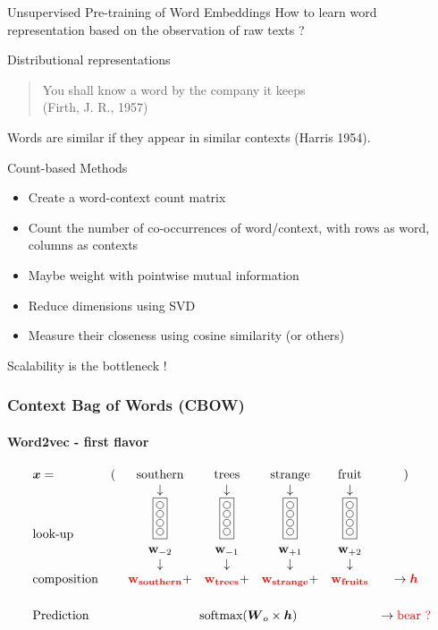 \begin{frame}{Unsupervised Pre-training of Word Embeddings}
  How to learn word representation based on the observation of raw texts ?
  \begin{block}{Distributional representations}
    \begin{quote}
    You shall know a word by the company it keeps\\  (Firth, J. R., 1957)
  \end{quote}
  Words are similar if they appear in similar contexts (Harris 1954).
\end{block}
\begin{block}{Count-based Methods}
  \begin{itemize}
  \item Create a word-context count matrix 
  \item Count the number of co-occurrences of word/context, with rows
    as word, columns as contexts
  \item Maybe weight with pointwise mutual information 
  \item Reduce dimensions using SVD 
  \item Measure their closeness using cosine similarity (or others)
\end{itemize}
\end{block}
Scalability is the bottleneck ! 
\end{frame}

\begin{frame}
  \frametitle{Context Bag of Words (CBOW)}
  \framesubtitle{Word2vec - first flavor}
  \begin{center}
    \begin{displaymath}
      \begin{array}{lcccccc}
        \x=&( &\textrm{southern} &\textrm{trees}  &\textrm{strange} &\textrm{fruit}  &)\\
           &&\downarrow & \downarrow & \downarrow & \downarrow & \\
        \textrm{look-up}&&\wemb &\wemb &\wemb &\wemb & \\
           &&  \vct{w}_{-2} &  \vct{w}_{-1} &  \vct{w}_{+1} &  \vct{w}_{+2} &\\
           && \downarrow &\downarrow &\downarrow &\downarrow & \\
        \textrm{composition} &&\important{\vct{w}_{southern}}+ &\important{\vct{w}_{trees}}+ &\important{\vct{w}_{strange}}+ &\important{\vct{w}_{fruits}} &\rightarrow\important{\seq{h}} \\[4ex]
        \textrm{Prediction}   &&\multicolumn{4}{c}{\textrm{softmax}(\seq{W}_{o} \times \seq{h})} &\rightarrow\important{\textrm{bear ?}}
      \end{array} 
    \end{displaymath}
  \end{center}
\end{frame}

